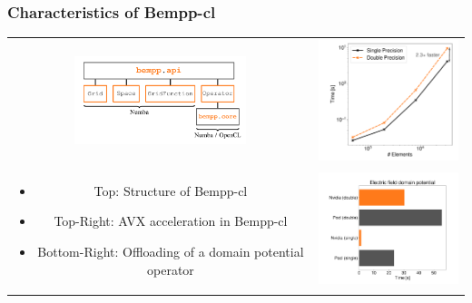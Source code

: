 \documentclass[dvipsnames,10pt]{beamer}
\begin{document}
\begin{frame}
	\frametitle{Characteristics of Bempp-cl}
	\vspace{-.1cm}
	\begin{center}
		\begin{tabular}{cc}
			\includegraphics[width=5cm]{../figs/bempp_cl_overview.png} & 
			\includegraphics[width=5cm]{../figs/bempp_single_vs_double.png} \\
			\begin{minipage}{5cm}
				\vspace{-4cm}
				\begin{itemize}
					\item Top: Structure of Bempp-cl
					\item Top-Right: AVX acceleration in Bempp-cl
					\item Bottom-Right: Offloading of a domain potential operator
				\end{itemize}
			\end{minipage}&
			\includegraphics[width=5cm]{../figs/gpu_offloading.png} 
		\end{tabular}
	\end{center}
\end{frame}
\end{document}
